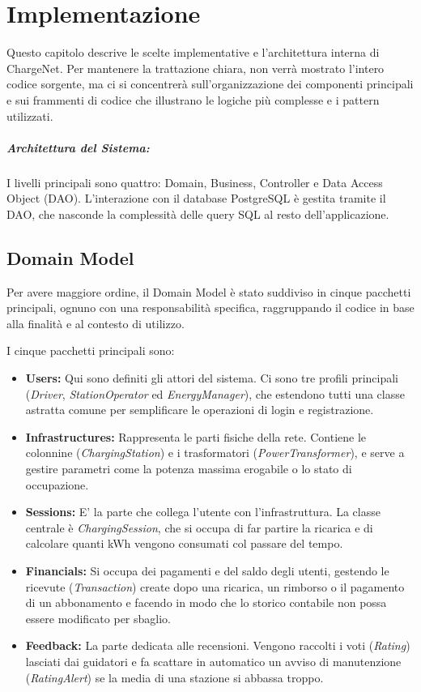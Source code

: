 \chapter{Implementazione}

Questo capitolo descrive le scelte implementative e l'architettura interna di ChargeNet. Per mantenere la trattazione chiara, non verrà mostrato l'intero codice sorgente, ma ci si concentrerà sull'organizzazione dei componenti principali e sui frammenti di codice che illustrano le logiche più complesse e i pattern utilizzati. 

\paragraph*{Architettura del Sistema:}

I livelli principali sono quattro: Domain, Business, Controller e Data Access Object (DAO).
L'interazione con il database PostgreSQL è gestita tramite il DAO, che nasconde la complessità delle query SQL al resto dell'applicazione. 

\section{Domain Model}
 \label{sec: Domain Model}

Per avere maggiore ordine, il Domain Model è stato suddiviso in cinque pacchetti principali, ognuno con una responsabilità specifica, raggruppando il codice in base alla finalità e al contesto di utilizzo.

I cinque pacchetti principali sono:
\begin{itemize}
    \item \textbf{Users:} Qui sono definiti gli attori del sistema. Ci sono tre profili principali (\textit{Driver}, \textit{StationOperator} ed \textit{EnergyManager}), che estendono tutti una classe astratta comune per semplificare le operazioni di login e registrazione.
    \item \textbf{Infrastructures:} Rappresenta le parti fisiche della rete. Contiene le colonnine (\textit{ChargingStation}) e i trasformatori (\textit{PowerTransformer}), e serve a gestire parametri come la potenza massima erogabile o lo stato di occupazione.
    \item \textbf{Sessions:} E' la parte che collega l'utente con l'infrastruttura. La classe centrale è \textit{ChargingSession}, che si occupa di far partire la ricarica e di calcolare quanti kWh vengono consumati col passare del tempo.
    \item \textbf{Financials:} Si occupa dei pagamenti e del saldo degli utenti, gestendo le ricevute (\textit{Transaction}) create dopo una ricarica, un rimborso o il pagamento di un abbonamento e facendo in modo che lo storico contabile non possa essere modificato per sbaglio.
    \item \textbf{Feedback:} La parte dedicata alle  recensioni. Vengono raccolti i voti (\textit{Rating}) lasciati dai guidatori e fa scattare in automatico un avviso di manutenzione (\textit{RatingAlert}) se la media di una stazione si abbassa troppo.
\end{itemize}

